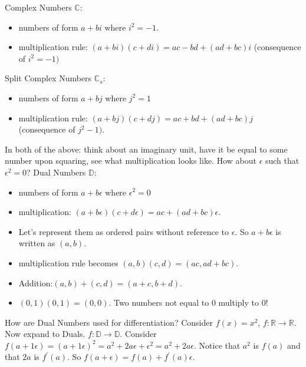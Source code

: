 \documentclass[11pt]{article}
\theoremstyle{definition}
\theoremstyle{plain}
\renewcommand{\b}[1]{\mathbb{#1}}
\begin{document}
\noindent Complex Numbers $\b{C}$:
\begin{itemize}
    \item numbers of form $a + bi$ where $i^2=-1$.
    \item multiplication rule: $(a+bi)(c+di) = ac - bd + (ad + bc)i$ 
          (consequence of $i^2=-1)$
\end{itemize}

\noindent Split Complex Numbers $\b{C}_s$:
\begin{itemize}
    \item numbers of form $a + bj$ where $j^2=1$ 
    \item multiplication rule: $(a + bj)(c + dj) = ac + bd + (ad + bc)j$ 
          (consequence of $j^2-1)$.
\end{itemize}

\noindent In both of the above: think about an imaginary unit, 
have it be equal to some number upon squaring, see what multiplication looks like.
How about $\epsilon$ such that $\epsilon^2=0$? Dual Numbers $\b{D}$: 
\begin{itemize}
    \item numbers of form $a + b \epsilon$ where $\epsilon^2 = 0$
    \item multiplication: $(a + b \epsilon)(c + d \epsilon) = ac + (ad+bc)\epsilon$.
    \item Let's represent them as ordered pairs without reference to $\epsilon$.
    So $a + b\epsilon$ is written as $(a,b)$.
    \item multiplication rule becomes $(a,b)(c,d)=(ac,ad+bc)$. 
    \item Addition:$(a,b)+(c,d)=(a+c,b+d)$.
    \item $(0,1)(0,1)=(0,0)$. Two numbers not equal to $0$ multiply
    to $0$!
\end{itemize}

\noindent How are Dual Numbers used for differentiation?
Consider $f(x)=x^2$, $f: \b{R} \rightarrow \b{R}$.
Now expand to Duals. $f: \b{D} \rightarrow \b{D}$.
Consider $f(a + 1\epsilon) = (a+1\epsilon)^2 = a^2 + 2a\epsilon + \epsilon^2 
= a^2 + 2a \epsilon $. Notice that $a^2$ is $f(a)$ and that $2a$ is $f^\prime(a)$.
So $f(a+\epsilon) = f(a) + f^\prime(a)\epsilon$.\\
\end{document}

